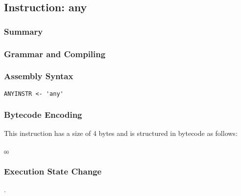 \subsection{Instruction: any}

\subsubsection{Summary}


\subsubsection{Grammar and Compiling}


\subsubsection{Assembly Syntax}

\begin{myquote}
\begin{verbatim}
ANYINSTR <- 'any'
\end{verbatim}
\end{myquote}


\subsubsection{Bytecode Encoding}

This instruction has a size of 4 bytes and is structured in bytecode as follows:

$_{00}$\ 


\subsubsection{Execution State Change}

.


